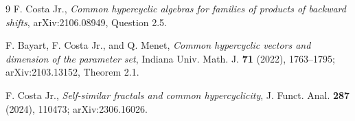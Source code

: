 \documentclass[11pt]{article}
\begin{document}
{\small
\begin{thebibliography}{9}
F. Costa Jr.,
\emph{Common hypercyclic algebras for families of products of backward
shifts}, arXiv:2106.08949, Question 2.5.

F. Bayart, F. Costa Jr., and Q. Menet,
\emph{Common hypercyclic vectors and dimension of the parameter set},
Indiana Univ. Math. J. \textbf{71} (2022), 1763--1795;
arXiv:2103.13152, Theorem 2.1.

F. Costa Jr.,
\emph{Self-similar fractals and common hypercyclicity},
J. Funct. Anal. \textbf{287} (2024), 110473; arXiv:2306.16026.
\end{thebibliography}
}
\end{document}

